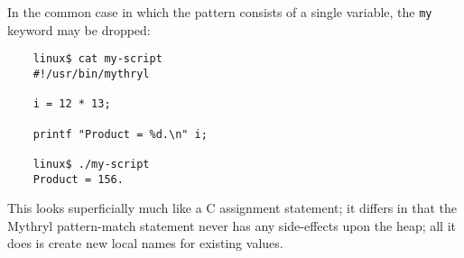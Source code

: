 In the common case in which the pattern consists of a single variable,
the {\tt my} keyword may be dropped:

\begin{verbatim}
    linux$ cat my-script
    #!/usr/bin/mythryl

    i = 12 * 13;

    printf "Product = %d.\n" i;

    linux$ ./my-script
    Product = 156.
\end{verbatim}

This looks superficially much like a C assignment statement; it differs 
in that the Mythryl pattern-match statement never has any side-effects 
upon the heap;  all it does is create new local names for existing values.

\cutend*


